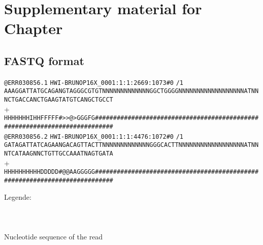 \chapter{Supplementary material for Chapter }
\label{ch:SupplIntro}

\section{FASTQ format}\label{sec:fastq-format}

{\color[rgb]{0.447059,0.678431,0.274510}\verb!@ERR030856.1!}
{\color[rgb]{0.500000,0.500000,0.500000}\verb!HWI-BRUNOP16X_0001:1:1:2669:1073#0!}%
{\color[rgb]{1.000000,0.000000,0.000000}\verb!/1!}\\
\verb!AAAGGATTATGCAGANGTAGGGCGTGTNNNNNNNNNNNNNGGCTGGGGNNNNNNNNNNNNNNNNNNATNNNCTGACCANCTGAAGTATGTCANGCTGCCT!\\
{\color[rgb]{0.698039,0.145098,0.450980}+}\\
{\color[rgb]{0.000000,0.000000,0.555711}\verb!HHHHHHHIHHFFFFF#>>@>GGGFG###########################################################################!}\\
{\color[rgb]{0.447059,0.678431,0.274510}\verb!@ERR030856.2!}
{\color[rgb]{0.500000,0.500000,0.500000}\verb!HWI-BRUNOP16X_0001:1:1:4476:1072#0!}%
{\color[rgb]{1.000000,0.000000,0.000000}\verb!/1!}\\
\verb!GATAGATTATCAGAANGACAGTTACTTNNNNNNNNNNNNNGGGCACTTNNNNNNNNNNNNNNNNNNATNNNTCATAAGNNCTGTTGCCAAATNAGTGATA!\\
{\color[rgb]{0.698039,0.145098,0.450980}+}\\
{\color[rgb]{0.000000,0.000000,0.555711}\verb!HHHHHHHHHHDDDDD#@@AAGGGGG###########################################################################!}

{\footnotesize
Legende:\\
\\
\\
\\
\quad\textbullet Nucleotide sequence of the read\\
\\
}


